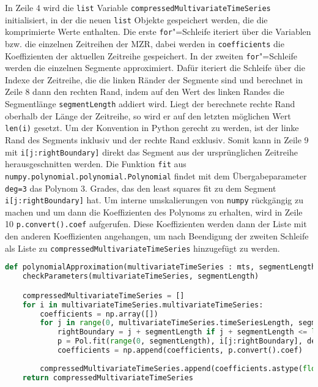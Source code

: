 In Zeile 4 wird die \lstinline|list| Variable \lstinline|compressedMultivariateTimeSeries| initialisiert, in der die neuen \lstinline|list| Objekte gespeichert werden, die die komprimierte Werte enthalten. Die erste \lstinline|for|"=Schleife iteriert über die Variablen bzw. die einzelnen Zeitreihen der \ac{MZR}, dabei werden in \lstinline|coefficients| die Koeffizienten der aktuellen Zeitreihe gespeichert. In der zweiten \lstinline|for|"=Schleife werden die einzelnen Segmente approximiert. Dafür iteriert die Schleife über die Indexe der Zeitreihe, die die linken Ränder der Segmente sind und berechnet in Zeile 8 dann den rechten Rand, indem auf den Wert des linken Randes die Segmentlänge \lstinline|segmentLength| addiert wird. Liegt der berechnete rechte Rand oberhalb der Länge der Zeitreihe, so wird er auf den letzten möglichen Wert \lstinline|len(i)| gesetzt. Um der Konvention in Python gerecht zu werden, ist der linke Rand des Segments inklusiv und der rechte Rand exklusiv. Somit kann in Zeile 9 mit \lstinline|i[j:rightBoundary]| direkt das Segment aus der ursprünglichen Zeitreihe herausgeschnitten werden. Die Funktion \lstinline|fit| aus \lstinline|numpy.polynomial.polynomial.Polynomial| findet mit dem Übergabeparameter \lstinline|deg=3| das Polynom 3. Grades, das den least squares fit zu dem Segment \lstinline|i[j:rightBoundary]| hat. Um interne umskalierungen von \lstinline|numpy| rückgängig zu machen und um dann die Koeffizienten des Polynoms zu erhalten, wird in Zeile 10 \lstinline|p.convert().coef| aufgerufen. Diese Koeffizienten werden dann der Liste mit den anderen Koeffizienten angehangen, um nach Beendigung der zweiten Schleife als Liste zu \lstinline|compressedMultivariateTimeSeries| hinzugefügt zu werden.
\begin{lstlisting}[caption=Stückweise polynomielle Approximation, label=lst:stückweisepolynomielleapproximation, style=Python, language=Python]
def polynomialApproximation(multivariateTimeSeries : mts, segmentLength : int):
    checkParameters(multivariateTimeSeries, segmentLength)

    compressedMultivariateTimeSeries = []
    for i in multivariateTimeSeries.multivariateTimeSeries:
        coefficients = np.array([])
        for j in range(0, multivariateTimeSeries.timeSeriesLength, segmentLength):
            rightBoundary = j + segmentLength if j + segmentLength <= len(i) else len(i)
            p = Pol.fit(range(0, segmentLength), i[j:rightBoundary], deg=3)
            coefficients = np.append(coefficients, p.convert().coef)
        
        compressedMultivariateTimeSeries.append(coefficients.astype(float).tolist())
    return compressedMultivariateTimeSeries
\end{lstlisting}


